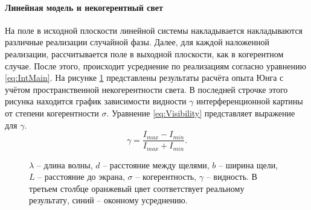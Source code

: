 \paragraph{Линейная модель и некогерентный свет}
На поле в исходной плоскости линейной системы накладывается накладываются различные реализации случайной фазы. Далее, для каждой наложенной реализации, рассчитывается поле в выходной плоскости, как в когерентном случае. После этого, происходит усреднение по реализациям согласно уравнению \ref{eq:IntMain}. На рисунке \ref{ris:YungExperiment} представлены результаты расчёта опыта Юнга с учётом пространственной некогерентности света. В последней строчке этого рисунка находится график зависимости видности $\gamma$ интерференционной картины от степени когерентности $\sigma$. Уравнение \ref{eq:Visibility} представляет выражение для $\gamma$.
\begin{equation}\label{eq:Visibility}
	\gamma = \frac{I_{max}-I_{min}}{I_{max}+I_{min}}.
\end{equation}
\begin{figure}[htbp]
	\caption{$\lambda$ -- длина волны, $d$ -- расстояние между щелями, $b$ -- ширина щели, $L$ -- расстояние до экрана, $\sigma$ -- когерентность, $\gamma$ -- видность. В третьем столбце оранжевый цвет соответствует реальному результату, синий -- оконному усреднению.}
	\label{ris:YungExperiment}
\end{figure}

